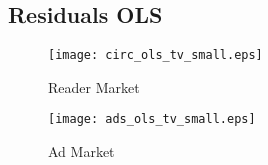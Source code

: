 \documentclass[10pt,a4paper]{scrreprt}
\begin{document}
\subsection{Residuals OLS}
\begin{figure}[H]
\begin{minipage}[hbt]{7cm}
	\centering
	\texttt{[image: circ\_ols\_tv\_small.eps]}
	\caption{Reader Market}
	\label{tvcirc}
\end{minipage}
\hfill
\begin{minipage}[hbt]{7cm}
	\centering
	\texttt{[image: ads\_ols\_tv\_small.eps]}
	\caption{Ad Market}
	\label{tvadsite}
\end{minipage}
\end{figure}
\end{document}
